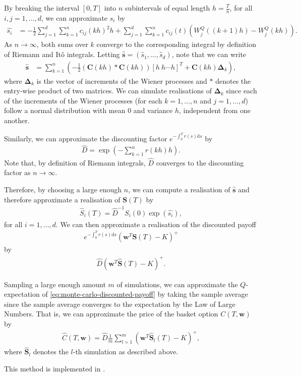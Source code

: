 \documentclass[english]{article}
\newcommand{\comment}[1]{\color{blue}#1\color{black}}
\numberwithin{equation}{section}
\numberwithin{figure}{section}
\theoremstyle{bolddescit}
\theoremstyle{definition}
\theoremstyle{definition}
\theoremstyle{plain}
\theoremstyle{plain}
\theoremstyle{bolddesc}
\theoremstyle{plain}
\theoremstyle{remark}
\begin{document}
By breaking the interval $[0,T]$ into $n$ subintervals of equal length $h = \frac{T}{n}$, for all $i,j=1,\ldots,d$, we can approximate $s_i$ by
\begin{align*}
  \hat{s_i} &= - \frac{1}{2} \sum_{j=1}^{d} \sum_{k=1}^{n} c_{ij}(kh)^2 h + \sum_{j=1}^{d} \sum_{k=1}^{n}  c_{ij}(t) (W^Q_j((k+1)h) - W^Q_j(kh)).
\end{align*}
As $n \to \infty$, both sums over $k$ converge to the corresponding integral by definition of Riemann and It\^o integrals. Letting $\hat{\mathbf{s}} = (\hat{s}_1,\ldots,\hat{s}_d)$, note that we can write
\begin{align*}
  \hat{\mathbf{s}} &= \sum_{k=1}^{n} \left( - \frac{1}{2} (\mathbf{C}(kh) * \mathbf{C}(kh)) [h\ h \cdots h]^T + \mathbf{C}(kh) \mathbf{\Delta}_k \right),
\end{align*}
where $\mathbf{\Delta}_k$ is the vector of increments of the Wiener processes and $*$ denotes the entry-wise product of two matrices. We can simulate realisations of $\mathbf{\Delta}_k$ since each of the increments of the Wiener processes (for each $k=1,\ldots,n$ and $j=1,\ldots,d$) follow a normal distribution with mean 0 and variance $h$, independent from one another.

Similarly, we can approximate the discounting factor $e^{-\int_0^T r(s) \mathrm{d}s}$ by
\begin{align*}
  \hat{D} = \exp \left(-\sum_{k=1}^{n} r(kh) h\right).
\end{align*}
Note that, by definition of Riemann integrals, $\hat{D}$ converges to the discounting factor as $n \to \infty$.

Therefore, by choosing a large enough $n$, we can compute a realisation of $\hat{\mathbf{s}}$ and therefore approximate a realisation of $\mathbf{S}(T)$ by
\begin{align*}
  \hat{S}_i(T) = \hat{D}^{-1} S_i(0) \exp\left(\hat{s_i}\right),
\end{align*}
for all $i=1,\ldots,d$. We can then approximate a realisation of the discounted payoff
\begin{align}\label{eq:monte-carlo-discounted-payoff}
  e^{-\int_0^T r(s) \mathrm{d}s} (\mathbf{w}^T \mathbf{S}(T) - K)^+
\end{align}
by
\begin{align*}
  \hat{D} (\mathbf{w}^T \hat{\mathbf{S}}(T) - K)^+.
\end{align*}

Sampling a large enough amount $m$ of simulations, we can approximate the $Q$-expectation of \eqref{eq:monte-carlo-discounted-payoff} by taking the sample average since the sample average converges to the expectation by the Law of Large Numbers. That is, we can approximate the price of the basket option $C(T,\mathbf{w})$ by
\begin{align*}
  \hat{C}(T,\mathbf{w}) = \hat{D} \frac{1}{m} \sum_{l=1}^{m} (\mathbf{w}^T \hat{\mathbf{S}}_l(T) - K)^+,
\end{align*}
where $\hat{\mathbf{S}}_l$ denotes the $l$-th simulation as described above.

This method is implemented in .


\pagebreak
\printbibliography
\end{document}
